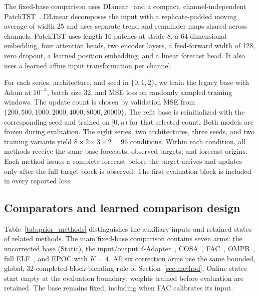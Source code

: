 The fixed-base comparison uses DLinear~\cite{dlinear2022} and a compact, channel-independent PatchTST~\cite{patchtst2023}. DLinear decomposes the input with a replicate-padded moving average of width 25 and uses separate trend and remainder maps shared across channels. PatchTST uses length-16 patches at stride 8, a 64-dimensional embedding, four attention heads, two encoder layers, a feed-forward width of 128, zero dropout, a learned position embedding, and a linear forecast head. It also uses a learned affine input transformation per channel.

For each series, architecture, and seed in $\{0,1,2\}$, we train the legacy base with Adam at $10^{-3}$, batch size 32, and MSE loss on randomly sampled training windows. The update count is chosen by validation MSE from $\{200,500,1000,2000,4000,8000,20000\}$. The refit base is reinitialized with the corresponding seed and trained on $[0,n)$ for that selected count. Both models are frozen during evaluation. The eight series, two architectures, three seeds, and two training variants yield $8\times2\times3\times2=96$ conditions. Within each condition, all methods receive the same base forecasts, observed targets, and forecast origins. Each method issues a complete forecast before the target arrives and updates only after the full target block is observed. The first evaluation block is included in every reported loss.

\subsection{Comparators and learned comparison design}
Table~\ref{tab:prior_methods} distinguishes the auxiliary inputs and retained states of related methods. The main fixed-base comparison contains seven arms: the uncorrected base (Static), the input/output $\delta$-Adapter~\cite{deltaadapter2026}, COSA~\cite{cosa2026}, FAC~\cite{fac2026}, OMPB~\cite{ompb2026}, full ELF~\cite{elf2025}, and EPOC with $K=4$. All six correction arms use the same bounded, global, 32-completed-block blending rule of Section~\ref{sec:method}. Online states start empty at the evaluation boundary; weights trained before evaluation are retained. The base remains fixed, including when FAC calibrates its input.

